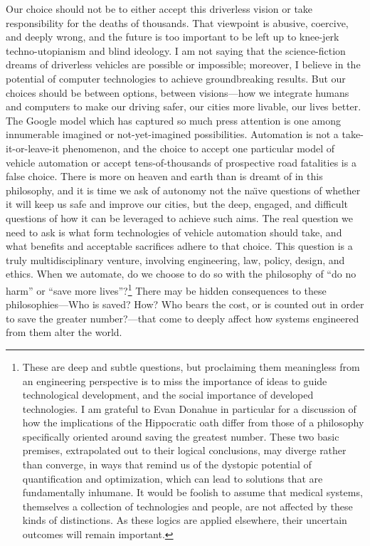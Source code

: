 Our choice should not be to either accept this driverless vision or take
responsibility for the deaths of thousands. That viewpoint is abusive, coercive,
and deeply wrong, and the future is too important to be left up to
knee-jerk techno-utopianism and blind ideology. I am not saying that
the science-fiction dreams of 
driverless vehicles are possible or impossible; moreover, I believe in the
potential of computer technologies to achieve groundbreaking results.
But our choices should be between options, between
visions---how we integrate humans and computers to make our
driving safer, our cities more livable, our lives better. The Google model which has
captured so much press attention is one among innumerable imagined or
not-yet-imagined possibilities. Automation is not a
take-it-or-leave-it phenomenon, and the choice to accept one
particular model of vehicle automation or accept tens-of-thousands of
prospective road fatalities is a false choice. There is more on heaven
and earth than is dreamt of in this philosophy, and it is time we ask
of autonomy not the na\"{\i}ve questions of whether it will keep us
safe and improve our cities, but the deep, engaged, and difficult
questions of how it can be leveraged to achieve such aims. The real
question we need to ask is what form technologies of vehicle automation 
should take, and what benefits and acceptable sacrifices adhere to
that choice. This question is a truly multidisciplinary venture,
involving engineering, law, policy, design, and ethics. When we
automate, do we choose to do so with the philosophy of ``do no harm''
or ``save more lives''?\footnote{These are deep and subtle questions,
  but proclaiming them meaningless from an engineering perspective is
  to miss the importance of ideas to guide technological development,
  and the social importance of developed technologies. I am grateful
  to Evan Donahue in particular for a discussion of how the
  implications of the Hippocratic oath differ from those of a
  philosophy specifically oriented around saving the greatest number.
  These two basic premises, extrapolated out to their logical
  conclusions, may diverge rather than converge, in ways that remind
  us of the dystopic potential of quantification and optimization,
  which can lead to solutions that are fundamentally inhumane. It
  would be foolish 
  to assume that medical systems, themselves a collection of
  technologies and people, are not affected by these kinds of
  distinctions. As these logics are applied elsewhere, their uncertain
  outcomes
  will remain important.} There may be hidden consequences to these 
philosophies---Who is saved? How? Who bears the cost, or is
counted out in order to save the greater number?---that come to deeply
affect how systems engineered from them alter the world.

